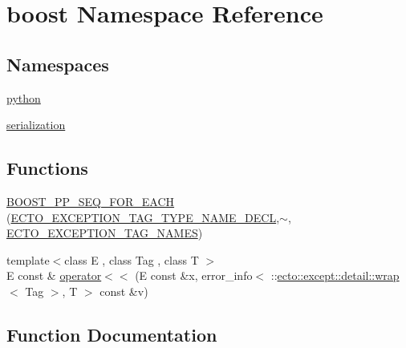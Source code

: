 \hypertarget{namespaceboost}{}\section{boost Namespace Reference}
\label{namespaceboost}
\subsection*{Namespaces}
\begin{DoxyCompactItemize}
\item 
 \hyperlink{namespaceboost_1_1python}{python}
\item 
 \hyperlink{namespaceboost_1_1serialization}{serialization}
\end{DoxyCompactItemize}
\subsection*{Functions}
\begin{DoxyCompactItemize}
\item 
\hyperlink{namespaceboost_ac098a4e20f2e80e827e2022ad264473a}{B\+O\+O\+S\+T\+\_\+\+P\+P\+\_\+\+S\+E\+Q\+\_\+\+F\+O\+R\+\_\+\+E\+A\+C\+H} (\hyperlink{except_8hpp_a61f61285d4749b701b559d10678908a4}{E\+C\+T\+O\+\_\+\+E\+X\+C\+E\+P\+T\+I\+O\+N\+\_\+\+T\+A\+G\+\_\+\+T\+Y\+P\+E\+\_\+\+N\+A\+M\+E\+\_\+\+D\+E\+C\+L},$\sim$, \hyperlink{except_8hpp_a6a632b3827deba566cbca48b37bf53e2}{E\+C\+T\+O\+\_\+\+E\+X\+C\+E\+P\+T\+I\+O\+N\+\_\+\+T\+A\+G\+\_\+\+N\+A\+M\+E\+S})
\item 
{\footnotesize template$<$class E , class Tag , class T $>$ }\\E const \& \hyperlink{namespaceboost_a50253cbebddb80700be930287ab2fcde}{operator$<$$<$} (E const \&x, error\+\_\+info$<$ \+::\hyperlink{structecto_1_1except_1_1detail_1_1wrap}{ecto\+::except\+::detail\+::wrap}$<$ Tag $>$, T $>$ const \&v)
\end{DoxyCompactItemize}


\subsection{Function Documentation}
\hypertarget{namespaceboost_ac098a4e20f2e80e827e2022ad264473a}{}
